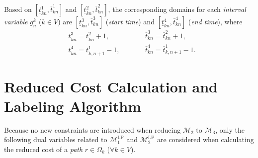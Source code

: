 \documentclass[12pt]{article}
\begin{document}
\begin{algorithm}[htp]\label{alg2}
    \LinesNumbered
    \caption{Procedure to Obtain the Domains $[\underline{t}_{kn}^{1},\overline{t}^{1}_{kn}]$ and $[\underline{t}_{kn}^{2},\overline{t}^{2}_{kn}]$}


\end{algorithm}

\noindent Based on $\left[\underline{t}_{kn}^{1},\overline{t}^{1}_{kn}\right]$ and $\left[\underline{t}_{kn}^{2},\overline{t}^{2}_{kn}\right]$, the corresponding domains for each \textit{interval variable} $g^k_n$ ($k\in V$) are $\left[\underline{t}_{kn}^{3},\overline{t}^{3}_{kn}\right]$ (\textit{start time}) and $\left[\underline{t}_{kn}^{4},\overline{t}^{4}_{kn}\right]$ (\textit{end time}), where
\begin{align*}
    &\underline{t}_{kn}^{3}= \underline{t}^2_{kn}+1,\qquad &&\overline{t}_{kn}^{3}=\overline{t}^{2}_{kn}+1, \\
    &\underline{t}^{4}_{kn}=\underline{t}^{1}_{k,n+1}-1, \qquad &&\overline{t}^{4}_{kn}=\overline{t}^1_{k,n+1}-1.
\end{align*}


\section{Reduced Cost Calculation and Labeling Algorithm}\label{app-sec5}
Because no new constraints are introduced when reducing $\mathcal{M}_2$ to $\mathcal{M}_3$, only the following dual variables related to $\mathcal{M}_1^{\text{LP}}$ and $\mathcal{M}_2^{\text{LP}}$ are considered when calculating the reduced cost of a \textit{path} $r\in \Omega_k$ ($\forall k\in V$).
\end{document}
